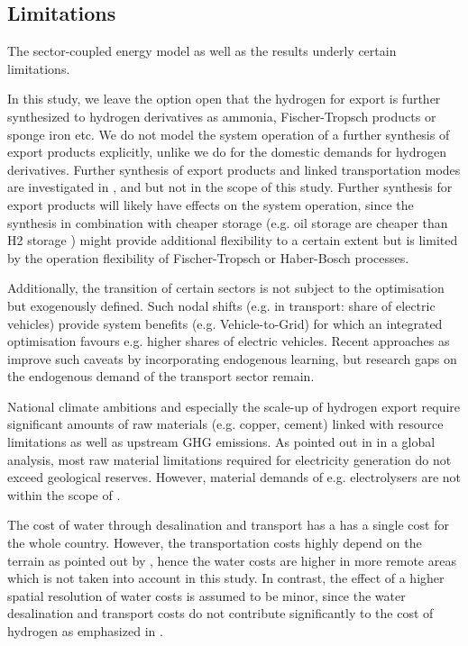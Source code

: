 \subsection*{Limitations}
\label{subsec:limitations}

The sector-coupled energy model as well as the results underly certain limitations. 

In this study, we leave the option open that the hydrogen for export is further synthesized to hydrogen derivatives as ammonia, Fischer-Tropsch products or sponge iron etc. We do not model the system operation of a further synthesis of export products explicitly, unlike we do for the domestic demands for hydrogen derivatives. Further synthesis of export products and linked transportation modes are investigated in \cite{Hampp2021}, \cite{Galimova2023} and \cite{Verpoort2023} but not in the scope of this study. Further synthesis for export products will likely have effects on the system operation, since the synthesis in combination with cheaper storage (e.g. oil storage are cheaper than H2 storage \cite{DEA2019TechnologyData}) might provide additional flexibility to a certain extent but is limited by the operation flexibility of Fischer-Tropsch or Haber-Bosch processes.

Additionally, the transition of certain sectors is not subject to the optimisation but exogenously defined. Such nodal shifts (e.g. in transport: share of electric vehicles) provide system benefits (e.g. Vehicle-to-Grid) for which an integrated optimisation favours e.g. higher shares of electric vehicles.
Recent approaches as \cite{Zeyen2023} improve such caveats by incorporating endogenous learning, but research gaps on the endogenous demand of the transport sector remain.

National climate ambitions and especially the scale-up of hydrogen export require significant amounts of raw materials (e.g. copper, cement) linked with resource limitations as well as upstream GHG emissions. As pointed out in \cite{Wang2023} in a global analysis, most raw material limitations required for electricity generation do not exceed geological reserves. However, material demands of e.g. electrolysers are not within the scope of \cite{Wang2023}.

The cost of water through desalination and transport has a 
has a single cost for the whole country. However, the transportation costs highly depend on the terrain as pointed out by \cite{Caldera2016}, hence the water costs are higher in more remote areas which is not taken into account in this study. In contrast, the effect of a higher spatial resolution of water costs is assumed to be minor, since the water desalination and transport costs do not contribute significantly to the cost of hydrogen as emphasized in \cite{Hampp2023}. %

